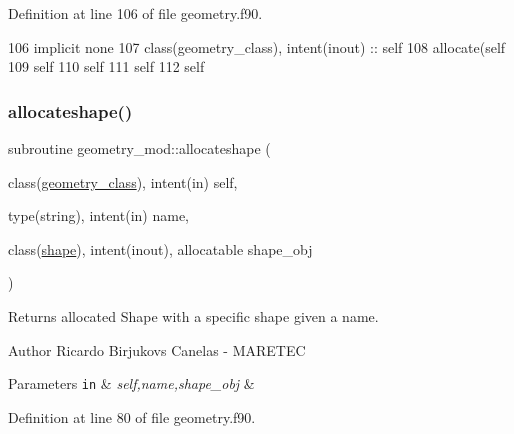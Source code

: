 Definition at line 106 of file geometry.\+f90.


\begin{DoxyCode}
106     \textcolor{keywordtype}{implicit none}
107     \textcolor{keywordtype}{class}(geometry\_class), \textcolor{keywordtype}{intent(inout)} :: self
108     \textcolor{keyword}{allocate}(self%
109     self%
110     self%
111     self%
112     self%
\end{DoxyCode}
\mbox{\label{namespacegeometry__mod_a571a294c2a1869259d21267005c32025}} 
\subsubsection{\texorpdfstring{allocateshape()}{allocateshape()}}
{\footnotesize\ttfamily subroutine geometry\+\_\+mod\+::allocateshape (\begin{DoxyParamCaption}\item[{class(\mbox{\hyperlink{structgeometry__mod_1_1geometry__class}{geometry\+\_\+class}}), intent(in)}]{self,  }\item[{type(string), intent(in)}]{name,  }\item[{class(\mbox{\hyperlink{structgeometry__mod_1_1shape}{shape}}), intent(inout), allocatable}]{shape\+\_\+obj }\end{DoxyParamCaption})\hspace{0.3cm}{\ttfamily [private]}}



Returns allocated Shape with a specific shape given a name. 

\begin{DoxyAuthor}{Author}
Ricardo Birjukovs Canelas -\/ M\+A\+R\+E\+T\+EC 
\end{DoxyAuthor}

\begin{DoxyParams}[1]{Parameters}
\mbox{\tt in}  & {\em self,name,shape\+\_\+obj} & \\
\hline
\end{DoxyParams}


Definition at line 80 of file geometry.\+f90.


